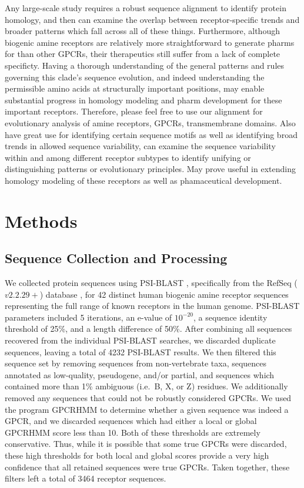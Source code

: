 \documentclass[fleqn,10pt]{wlpeerj}
\begin{document}
Any large-scale study requires a robust sequence alignment to identify protein homology, and then can examine the overlap between receptor-specific trends and broader patterns which fall across all of these things. Furthermore, although biogenic amine receptors are relatively more straightforward to generate pharms for than other GPCRs, their therapeutics still suffer from a lack of complete specificty. Having a thorough understanding of the general patterns and rules governing this clade's sequence evolution, and indeed understanding the permissible amino acids at structurally important positions, may enable substantial progress in homology modeling and pharm development for these important receptors.
Therefore, please feel free to use our alignment for evolutionary analysis of amine receptors, GPCRs, transmembrane domains. Also have great use for identifying certain sequence motifs as well as identifying broad trends in allowed sequence variability, can examine the sequence variability within and among different receptor subtypes to identify unifying or distinguishing patterns or evolutionary principles. May prove useful in extending homology modeling of these receptors as well as phamaceutical development. 



\section*{Methods}

\subsection*{Sequence Collection and Processing}
We collected protein sequences using PSI-BLAST \citep{psiblast}, specifically from the RefSeq ($v2.2.29+$) database \citep{refseq}, for 42 distinct human biogenic amine receptor sequences representing the full range of known receptors in the human genome. PSI-BLAST parameters included 5 iterations, an e-value of $10^{-20}$, a sequence identity threshold of 25\%, and a length difference of 50\%. After combining all sequences recovered from the individual PSI-BLAST searches, we discarded duplicate sequences, leaving a total of 4232 PSI-BLAST results. We then filtered this sequence set by removing sequences from non-vertebrate taxa, sequences annotated as low-quality, pseudogene, and/or partial, and sequences which contained more than 1\% ambiguous (i.e.\ B, X, or Z) residues. We additionally removed any sequences that could not be robustly considered GPCRs. We used the program GPCRHMM \citep{Wistrand2006} to determine whether a given sequence was indeed a GPCR, and we discarded sequences which had either a local or global GPCRHMM score less than 10. Both of these thresholds are extremely conservative. Thus, while it is possible that some true GPCRs were discarded, these high thresholds for both local and global scores provide a very high confidence that all retained sequences were true GPCRs. Taken together, these filters left a total of 3464 receptor sequences.
\end{document}
